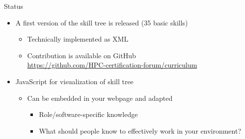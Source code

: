 \documentclass[compress,aspectratio=169]{beamer}
\begin{document}
\begin{frame}{Status}
		\begin{block}{}
			\begin{itemize}
				\item A first version of the skill tree is released (35 basic skills)
					\begin{itemize}
						\item Technically implemented as XML
						\item Contribution is available on GitHub \\
							\url{https://github.com/HPC-certification-forum/curriculum}
					\end{itemize}
				\item JavaScript for visualization of skill tree
					\begin{itemize}
						\item Can be embedded in your webpage and adapted
							\begin{itemize}
								\item Role/software-specific knowledge
								\item What should people know to effectively work in your environment?
							\end{itemize}
					\end{itemize}
			\end{itemize}
		\end{block}
\end{frame}
\end{document}
